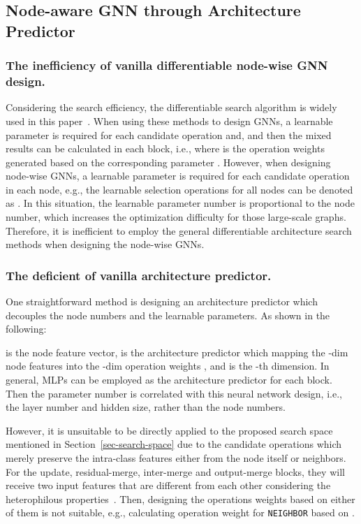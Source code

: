 \documentclass[sigconf]{acmart}
\begin{document}
\subsection{Node-aware GNN through Architecture Predictor}






\subsubsection{The inefficiency of vanilla differentiable node-wise GNN design.}
Considering the search efficiency, the differentiable search algorithm is widely used in this paper~\cite{xie2018snas,liu2018darts}. When using these methods to design GNNs, a learnable parameter  is required for each candidate operation and, and then the mixed results can be calculated in each block, i.e.,   where  is the operation weights generated based on the corresponding parameter . 
However, when designing node-wise GNNs, a learnable parameter is required for each candidate operation in each node, 
e.g., the learnable selection operations for all nodes can be denoted as . 
In this situation, the learnable parameter number is proportional to the node number, which increases the optimization difficulty for those large-scale graphs. Therefore, it is inefficient to employ the general differentiable architecture search methods when designing the node-wise GNNs.





\subsubsection{The deficient of vanilla architecture predictor.}
One straightforward method is designing an architecture predictor which decouples the node numbers and the learnable parameters. As shown in the following:

 is the node feature vector,  is the architecture predictor which mapping the -dim node features into the -dim operation weights , and  is the -th dimension. In general, MLPs can be employed as the architecture predictor for each block. Then the parameter number is correlated with this neural network design, i.e., the layer number and hidden size,  rather than the node numbers.


However, it is unsuitable to be directly applied to the proposed search space mentioned in Section~\ref{sec-search-space} due to the candidate operations which merely preserve the intra-class features either from the node itself or neighbors.
For the update, residual-merge, inter-merge and output-merge blocks, they will receive two input features that are different from each other considering the heterophilous properties~\cite{zhu2020beyond}.
Then, designing the operations weights based on either of them is not suitable, e.g., calculating operation weight for \texttt{NEIGHBOR} based on  .
\end{document}
